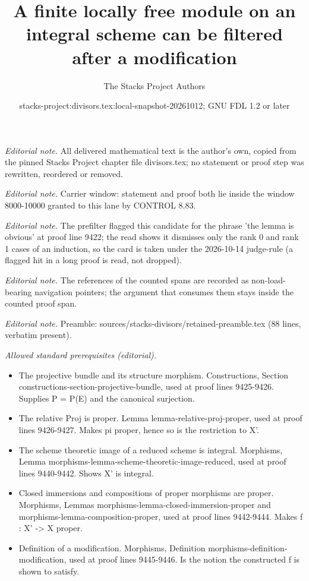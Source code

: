\documentclass[10pt,a4paper]{amsart}
\title{A finite locally free module on an integral scheme can be filtered after a modification}
\author{The Stacks Project Authors}
\date{stacks-project:divisors.tex:local-snapshot-20261012; GNU FDL 1.2 or later}
\theoremstyle{plain}
\theoremstyle{definition}
\theoremstyle{remark}
\numberwithin{equation}{subsection}
\begin{document}
\maketitle
\setcounter{subsection}{1}
\noindent\textit{Editorial note.} All delivered mathematical text is the author's own, copied from the pinned Stacks Project chapter file divisors.tex; no statement or proof step was rewritten, reordered or removed.\par\medskip
\noindent\textit{Editorial note.} Carrier window: statement and proof both lie inside the window 8000-10000 granted to this lane by CONTROL 8.83.\par\medskip
\noindent\textit{Editorial note.} The prefilter flagged this candidate for the phrase 'the lemma is obvious' at proof line 9422; the read shows it dismisses only the rank 0 and rank 1 cases of an induction, so the card is taken under the 2026-10-14 judge-rule (a flagged hit in a long proof is read, not dropped).\par\medskip
\noindent\textit{Editorial note.} The references of the counted spans are recorded as non-load-bearing navigation pointers; the argument that consumes them stays inside the counted proof span.\par\medskip
\noindent\textit{Editorial note.} Preamble: sources/stacks-divisors/retained-preamble.tex (88 lines, verbatim present).\par\medskip
\noindent\textit{Allowed standard prerequisites (editorial).}\begin{itemize}
\item The projective bundle and its structure morphism. Constructions, Section constructions-section-projective-bundle, used at proof lines 9425-9426. Supplies P = P(E) and the canonical surjection.
\item The relative Proj is proper. Lemma lemma-relative-proj-proper, used at proof lines 9426-9427. Makes pi proper, hence so is the restriction to X'.
\item The scheme theoretic image of a reduced scheme is integral. Morphisms, Lemma morphisms-lemma-scheme-theoretic-image-reduced, used at proof lines 9440-9442. Shows X' is integral.
\item Closed immersions and compositions of proper morphisms are proper. Morphisms, Lemmas morphisms-lemma-closed-immersion-proper and morphisms-lemma-composition-proper, used at proof lines 9442-9444. Makes f : X' -> X proper.
\item Definition of a modification. Morphisms, Definition morphisms-definition-modification, used at proof lines 9445-9446. Is the notion the constructed f is shown to satisfy.
\end{itemize}\medskip
\end{document}
